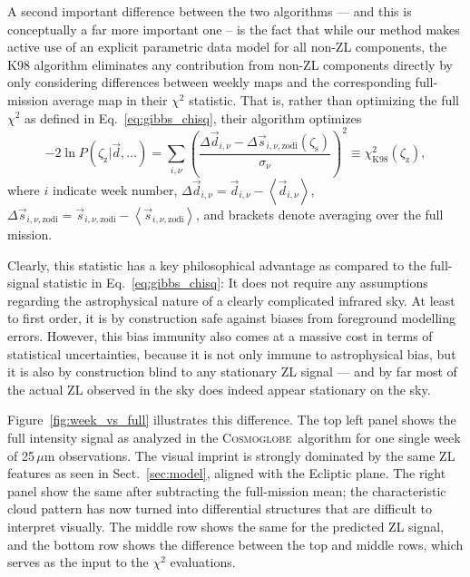 \documentclass[twocolumn]{aa}
\newcommand{\dv}[0]{\vec{d}}
\newcommand{\s}[0]{\vec{s}}
\newcommand{\cosmoglobe}{\textsc{Cosmoglobe}}
\begin{document}
A second important difference between the two algorithms --- and this
is conceptually a far more important one -- is the fact that while our
method makes active use of an explicit parametric data model for all
non-ZL components, the K98 algorithm eliminates any contribution from
non-ZL components directly by only considering differences between
weekly maps and the corresponding full-mission average map in their
$\chi^2$ statistic. That is, rather than optimizing the full $\chi^2$
as defined in Eq.~\eqref{eq:gibbs_chisq}, their algorithm optimizes
\begin{equation}
  -2\ln P(\zeta_{\mathrm{z}}|\dv, \ldots) = \sum_{i,\nu}
  \left(\frac{\Delta\dv_{i,\nu} -
    \Delta\s_{i,\nu,\mathrm{zodi}}(\zeta_\mathrm{s})}{\sigma_{\nu}}\right)^2 \equiv
  \chi^2_{\mathrm{K98}} (\zeta_{\mathrm{z}}),
  \label{eq:k98_chisq}
\end{equation}
where $i$ indicate week number, $\Delta \dv_{i,\nu} = \dv_{i,\nu} -
\left<\dv_{i,\nu}\right>$, $\Delta \s_{i,\nu,\mathrm{zodi}} =
\s_{i,\nu,\mathrm{zodi}} - \left<\s_{i,\nu,\mathrm{zodi}}\right>$, and brackets
denote averaging over the full mission.

Clearly, this statistic has a key philosophical advantage as compared
to the full-signal statistic in Eq.~\eqref{eq:gibbs_chisq}: It does
not require any assumptions regarding the astrophysical nature of a
clearly complicated infrared sky. At least to first order, it is by
construction safe against biases from foreground modelling
errors. However, this bias immunity also comes at a massive cost in
terms of statistical uncertainties, because it is not only immune to
astrophysical bias, but it is also by construction blind to any
stationary ZL signal --- and by far most of the actual ZL observed in
the sky does indeed appear stationary on the sky.

Figure~\ref{fig:week_vs_full} illustrates this difference. The top
left panel shows the full intensity signal as analyzed in the
\cosmoglobe\ algorithm for one single week of 25\,$\mu$m
observations. The visual imprint is strongly dominated by the same ZL
features as seen in Sect.~\ref{sec:model}, aligned with the Ecliptic
plane. The right panel show the same after subtracting the
full-mission mean; the characteristic cloud pattern has now turned
into differential structures that are difficult to interpret
visually. The middle row shows the same for the predicted ZL signal,
and the bottom row shows the difference between the top and middle
rows, which serves as the input to the $\chi^2$ evaluations.
\end{document}
